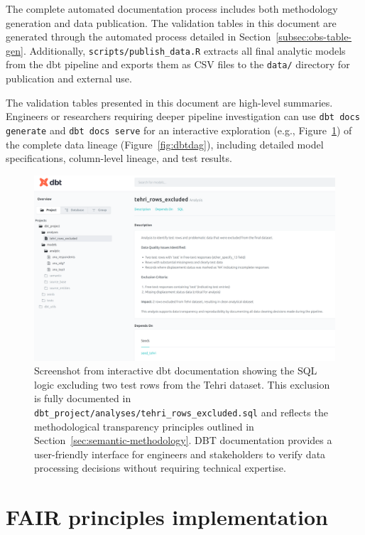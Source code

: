 \documentclass{article}
\begin{document}
The complete automated documentation process includes both methodology generation and data publication. The validation tables in this document are generated through the automated process detailed in Section~\ref{subsec:obs-table-gen}. Additionally, \texttt{scripts/publish\_data.R} extracts all final analytic models from the dbt pipeline and exports them as CSV files to the \texttt{data/} directory for publication and external use.

The validation tables presented in this document are high-level summaries. Engineers or researchers requiring deeper pipeline investigation can use \texttt{dbt docs generate} and \texttt{dbt docs serve} for an interactive exploration (e.g., Figure~\ref{fig:tehri-exclusions}) of the complete data lineage (Figure~\ref{fig:dbtdag}), including detailed model specifications, column-level lineage, and test results. 

\begin{figure}[ht]
  \centering
  \includegraphics[width=\textwidth]{img/dbt-docs-tehri-exclusions.png}
  \caption{\label{fig:tehri-exclusions} Screenshot from interactive dbt documentation showing the SQL logic excluding two test rows from the Tehri dataset. This exclusion is fully documented in \texttt{dbt\_project/analyses/tehri\_rows\_excluded.sql} and reflects the methodological transparency principles outlined in Section~\ref{sec:semantic-methodology}. DBT documentation provides a user-friendly interface for engineers and stakeholders to verify data processing decisions without requiring technical expertise.}
\end{figure}

\section{FAIR principles implementation}
\label{sec:fair}
\end{document}
